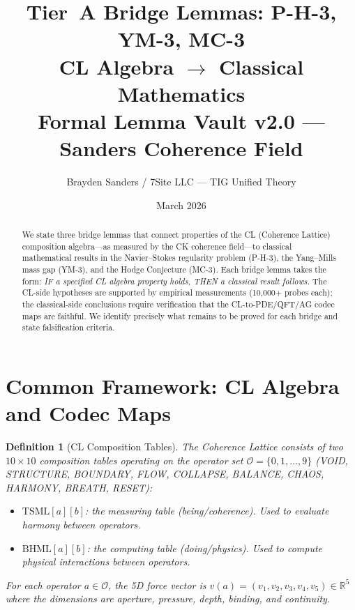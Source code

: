 \documentclass[11pt]{article}
\title{%
  Tier~A Bridge Lemmas: P-H-3, YM-3, MC-3\\[4pt]
  \large CL Algebra $\longrightarrow$ Classical Mathematics\\[4pt]
  \large Formal Lemma Vault v2.0 --- Sanders Coherence Field}
\author{Brayden Sanders / 7Site LLC --- TIG Unified Theory}
\date{March 2026}
\newtheorem{definition}[lemma]{Definition}
\theoremstyle{definition}
\begin{document}
\maketitle

\begin{abstract}
We state three bridge lemmas that connect properties of the CL (Coherence Lattice)
composition algebra---as measured by the CK coherence field---to classical mathematical
results in the Navier--Stokes regularity problem (P-H-3), the Yang--Mills mass gap (YM-3),
and the Hodge Conjecture (MC-3).  Each bridge lemma takes the form:
\emph{IF a specified CL algebra property holds, THEN a classical result follows.}
The CL-side hypotheses are supported by empirical measurements (10,000+ probes each);
the classical-side conclusions require verification that the CL-to-PDE/QFT/AG codec
maps are faithful.  We identify precisely what remains to be proved for each bridge
and state falsification criteria.
\end{abstract}

\tableofcontents

\section{Common Framework: CL Algebra and Codec Maps}

\begin{definition}[CL Composition Tables]
\label{def:cl-tables}
The Coherence Lattice consists of two $10 \times 10$ composition tables operating on
the operator set $\mathcal{O} = \{0, 1, \ldots, 9\}$
(VOID, STRUCTURE, BOUNDARY, FLOW, COLLAPSE, BALANCE, CHAOS, HARMONY, BREATH, RESET):
\begin{itemize}
  \item $\mathrm{TSML}[a][b]$: the \emph{measuring} table (being/coherence).
    Used to evaluate harmony between operators.
  \item $\mathrm{BHML}[a][b]$: the \emph{computing} table (doing/physics).
    Used to compute physical interactions between operators.
\end{itemize}
For each operator $a \in \mathcal{O}$, the 5D force vector is
$v(a) = (v_1, v_2, v_3, v_4, v_5) \in \mathbb{R}^5$ where the dimensions are
aperture, pressure, depth, binding, and continuity.
\end{definition}
\end{document}
